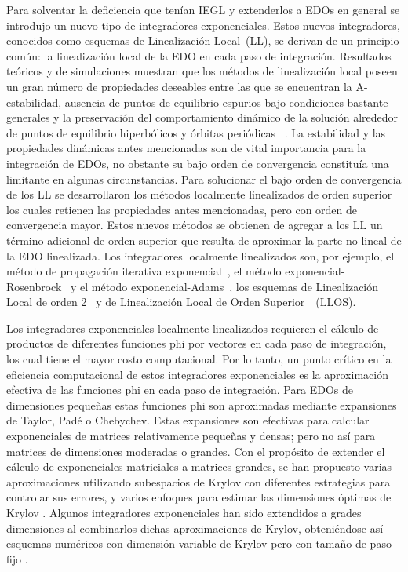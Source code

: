 Para solventar la deficiencia que tenían IEGL y extenderlos a EDOs en general se introdujo un nuevo tipo de integradores exponenciales. Estos nuevos integradores, conocidos como esquemas de Linealización Local~(LL), se derivan de un principio común: la linealización local de la EDO en cada paso de integración. Resultados teóricos y de simulaciones muestran que los métodos de linealización local poseen un gran número de propiedades deseables entre las que se encuentran la A-estabilidad, ausencia de puntos de equilibrio espurios bajo condiciones bastante generales y la preservación del comportamiento dinámico de la solución alrededor de puntos de equilibrio hiperbólicos y órbitas periódicas ~\cite{Jimenez02AMC,delaCruz06,delaCruz07,Jimenez13}. La estabilidad y las propiedades dinámicas antes mencionadas son de vital importancia para la integración de EDOs, no obstante su bajo orden de convergencia constituía una limitante en algunas circunstancias. Para solucionar el bajo orden de convergencia de los LL se desarrollaron los métodos localmente linealizados de orden superior los cuales retienen las propiedades antes mencionadas, pero con orden de convergencia mayor. Estos nuevos métodos se obtienen de agregar a los LL un término adicional de orden superior que resulta de aproximar la parte no lineal de la EDO linealizada. Los integradores localmente linealizados son, por ejemplo, el método de propagación iterativa exponencial~\cite{tokman2006efficient}, el método exponencial-Rosenbrock~\cite{tranquilli2014rosenbrock} y el método exponencial-Adams~\cite{hochbruck2011exponential}, los esquemas de Linealización Local de orden 2~\cite{pope1963exponential,hochbruck1997krylov,hochbruck1998exponential} y de Linealización Local de Orden Superior~~(LLOS)\cite{delaCruz06,delaCruz07,Jimenez13,Jimenez14AMC}.

Los integradores exponenciales localmente linealizados requieren el cálculo de productos de diferentes funciones phi por vectores en cada paso de integración, los cual tiene el mayor costo computacional. Por lo tanto, un punto crítico en la eficiencia computacional de estos integradores exponenciales es la aproximación efectiva de las funciones phi en cada paso de integración. Para EDOs de dimensiones pequeñas estas funciones phi son aproximadas mediante expansiones de Taylor, Padé o Chebychev. Estas expansiones son efectivas para calcular exponenciales de matrices relativamente pequeñas y densas; pero no así para matrices
de dimensiones moderadas o grandes. Con el propósito de extender el cálculo de exponenciales matriciales a matrices grandes, se han propuesto varias aproximaciones utilizando subespacios de Krylov con diferentes estrategias para controlar sus errores, y varios enfoques para estimar las dimensiones óptimas de Krylov \cite{hochbruck1998exponential,sidje1998expokit,niesen2012algorithm,gaudreault2018kiops}. Algunos integradores exponenciales han sido extendidos a grades dimensiones al combinarlos dichas aproximaciones de Krylov, obteniéndose así esquemas numéricos con dimensión variable de Krylov pero con tamaño de paso fijo \cite{tokman2006efficient,tranquilli2014rosenbrock,hochbruck2011exponential,kloeden2011exponential}.

